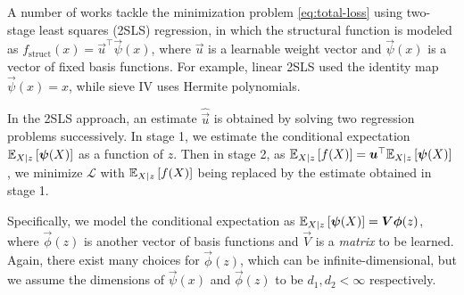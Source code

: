 A number of works \citep{Newey2003,Singh2019} tackle the minimization problem  \eqref{eq:total-loss} using two-stage least squares (2SLS) regression, in which the
structural function is modeled as $f_{\mathrm{struct}}(x) = \vec{u}^\top \vec{\psi}(x)$, where $\vec{u}$ is a learnable weight vector and 
$\vec{\psi}(x)$ is a vector of fixed basis functions. For example, linear 2SLS used the identity map $\vec{\psi}(x) = x$, while sieve IV \citep{Newey2003} uses Hermite polynomials. %

In the 2SLS approach, an estimate $\hat{\vec{u}}$ is obtained by solving two regression problems successively. In stage 1, we estimate the conditional expectation $\expect[X|z]{\vec{\psi}(X)}$ as a function of $z$. Then in stage 2, as $\expect[X|z]{f(X)} = \vec{u}^\top\expect[X|z]{\vec{\psi}(X)}$, we minimize $\mathcal{L}$ with $\expect[X|z]{f(X)}$ being replaced by the estimate obtained in stage 1.

Specifically, we model the conditional expectation as $\expect[X|z]{\vec{\psi}(X)} = \vec{V}\vec{\phi}(z)$, where $\vec{\phi}(z)$ is another vector of basis functions and $\vec{V}$ is a \emph{matrix} to be learned. Again, there exist many choices for $\vec{\phi}(z)$, which can be infinite-dimensional, but we assume the dimensions of $\vec{\psi}(x)$ and $\vec{\phi}(z)$ to be $d_1, d_2 < \infty$ respectively.


